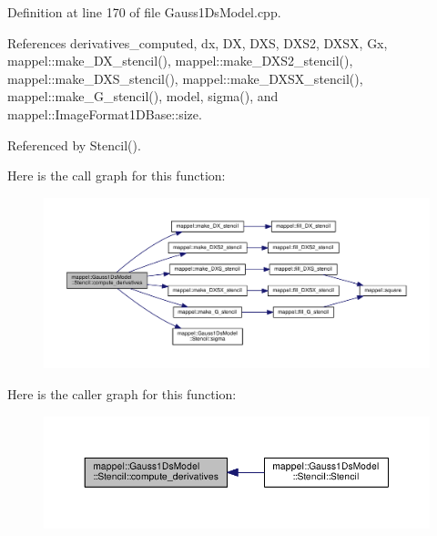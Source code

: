 Definition at line 170 of file Gauss1\+Ds\+Model.\+cpp.



References derivatives\+\_\+computed, dx, DX, D\+XS, D\+X\+S2, D\+X\+SX, Gx, mappel\+::make\+\_\+\+D\+X\+\_\+stencil(), mappel\+::make\+\_\+\+D\+X\+S2\+\_\+stencil(), mappel\+::make\+\_\+\+D\+X\+S\+\_\+stencil(), mappel\+::make\+\_\+\+D\+X\+S\+X\+\_\+stencil(), mappel\+::make\+\_\+\+G\+\_\+stencil(), model, sigma(), and mappel\+::\+Image\+Format1\+D\+Base\+::size.



Referenced by Stencil().



Here is the call graph for this function\+:\nopagebreak
\begin{figure}[H]
\begin{center}
\leavevmode
\includegraphics[width=350pt]{classmappel_1_1Gauss1DsModel_1_1Stencil_a9e8b6059b84e28bea0ba3496bc95e7ce_cgraph}
\end{center}
\end{figure}




Here is the caller graph for this function\+:\nopagebreak
\begin{figure}[H]
\begin{center}
\leavevmode
\includegraphics[width=350pt]{classmappel_1_1Gauss1DsModel_1_1Stencil_a9e8b6059b84e28bea0ba3496bc95e7ce_icgraph}
\end{center}
\end{figure}


